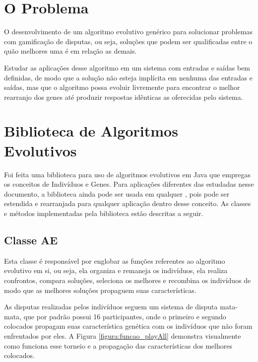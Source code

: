 \section{O Problema}

O desenvolvimento de um algoritmo evolutivo genérico para solucionar problemas com gamificação de disputas, ou seja, soluções que podem ser qualificadas entre o quão melhores uma é em relação as demais.

Estudar as aplicações desse algoritmo em um sistema com entradas e saídas bem definidas, de modo que a solução não esteja implícita em nenhuma das entradas e saídas, mas que o algoritmo possa evoluir livremente para encontrar o melhor rearranjo dos genes até produzir respostas idênticas as oferecidas pelo sistema.

\section{Biblioteca de Algoritmos Evolutivos}

Foi feita uma biblioteca para uso de algoritmos evolutivos em Java que empregas os conceitos de Indivíduos e Genes. Para aplicações diferentes das estudadas nesse documento, a biblioteca ainda pode ser usada em qualquer \SE, pois pode ser estendida e rearranjada para qualquer aplicação dentro desse conceito. As classes e métodos implementadas pela biblioteca estão descritas a seguir.

\subsection{Classe AE}

Esta classe é responsável por englobar as funções referentes ao algoritmo evolutivo em si, ou seja, ela organiza e remaneja os indivíduos, ela realiza confrontos, compara soluções, seleciona os melhores e recombina os indivíduos de modo que as melhores soluções propaguem suas características.

As disputas realizadas pelos indivíduos seguem um sistema de disputa mata-mata, que por padrão possui 16 participantes, onde o primeiro e segundo colocados propagam suas característica genética com os indivíduos que não foram enfrentados por eles. A Figura \ref{figura:funcao_playAll} demonstra visualmente como funciona esse torneio e a propagação das características dos melhores colocados.

